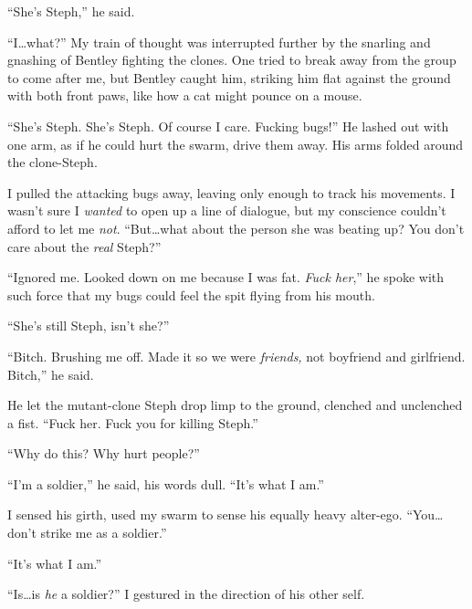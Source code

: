 ``She's Steph,'' he said.



``I\ldots what?''  My train of thought was interrupted further by the snarling and gnashing of Bentley fighting the clones.  One tried to break away from the group to come after me, but Bentley caught him, striking him flat against the ground with both front paws, like how a cat might pounce on a mouse.



``She's Steph.  She's Steph.  Of course I care.  Fucking bugs!''  He lashed out with one arm, as if he could hurt the swarm, drive them away.  His arms folded around the clone-Steph.



I pulled the attacking bugs away, leaving only enough to track his movements.  I wasn't sure I \emph{wanted} to open up a line of dialogue, but my conscience couldn't afford to let me \emph{not}.  ``But\ldots what about the person she was beating up?  You don't care about the \emph{real} Steph?''



``Ignored me.  Looked down on me because I was fat.  \emph{Fuck her},'' he spoke with such force that my bugs could feel the spit flying from his mouth.



``She's still Steph, isn't she?''



``Bitch.  Brushing me off.  Made it so we were \emph{friends, }not boyfriend and girlfriend.  Bitch,'' he said.



He let the mutant-clone Steph drop limp to the ground, clenched and unclenched a fist.  ``Fuck her.  Fuck you for killing Steph.''



``Why do this?  Why hurt people?''



``I'm a soldier,'' he said, his words dull.  ``It's what I am.''



I sensed his girth, used my swarm to sense his equally heavy alter-ego.  ``You\ldots don't strike me as a soldier.''



``It's what I am.''



``Is\ldots is \emph{he} a soldier?'' I gestured in the direction of his other self.



